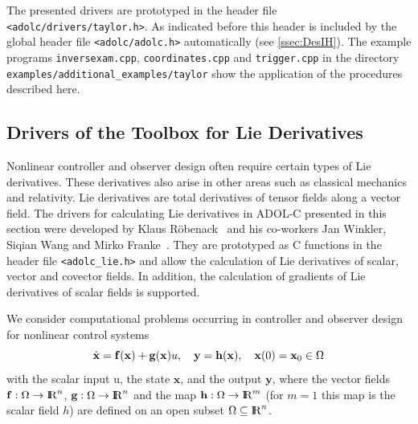 \documentclass[11pt,twoside]{article}
\newcommand{\R}{{ {\rm I} \kern -.225em {\rm R} }}
\begin{document}
The presented drivers are prototyped in the header file 
\verb=<adolc/drivers/taylor.h>=. As indicated before this header
is included by the global header file \verb=<adolc/adolc.h>= automatically
(see \autoref{ssec:DesIH}). 
The example programs \verb=inversexam.cpp=, \verb=coordinates.cpp= and 
\verb=trigger.cpp=  in the directory \verb=examples/additional_examples/taylor= 
show the application of the procedures described here.
%
\subsection{Drivers of the Toolbox for Lie Derivatives}
Nonlinear controller and observer design often require certain types of Lie derivatives. These derivatives also arise in other areas such as classical mechanics and relativity.
Lie derivatives are total derivatives of tensor fields along a vector field.
The drivers for calculating Lie derivatives in ADOL-C presented in this section
were developed by Klaus R{\"o}benack~\cite{Roeb05} and his co-workers Jan Winkler, Siqian Wang and Mirko Franke~\cite{Roeb11}. 
They are prototyped as C functions in the header file {\verb=<adolc_lie.h>=} and
allow the calculation of Lie derivatives of scalar, vector and covector fields. In addition, the calculation of gradients of Lie derivatives of scalar fields is supported.

We consider computational problems occurring in controller and observer design for 
nonlinear control systems
\begin{equation*}
\dot{\mathbf x}=\mathbf f(\mathbf x)+\mathbf g(\mathbf x)u,
\quad \mathbf y=\mathbf h(\mathbf x),\quad \mathbf x(0)=\mathbf x_0 \in \Omega\\
\end{equation*}
with the scalar input u, the state $\mathbf x$, and the output $\mathbf y$, where the vector
fields $\mathbf f : \Omega \to \R^n$, $\mathbf g: \Omega \to \R^n$
and the map $\mathbf h: \Omega\to \R^m$ (for $m=1$ this map is the scalar field $h$) 
are defined on an open subset $\Omega\subseteq\R^n$. 

\sloppy
\end{document}
